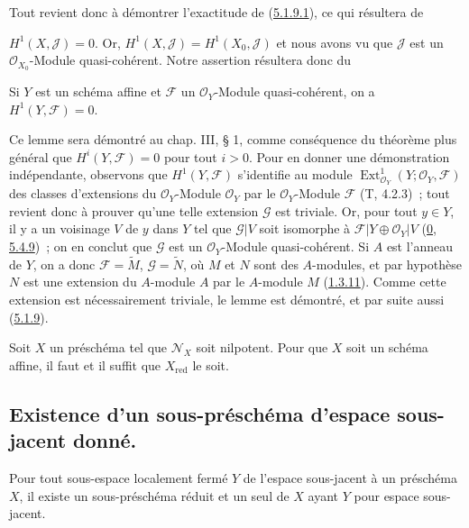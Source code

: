 Tout revient donc à démontrer l'exactitude de
(\hyperref[I.5.1.9.1-fr]{5.1.9.1}), ce qui résultera de

$H^1(X,\mathscr{J})=0$. Or,
$H^1(X,\mathscr{J})=H^1(X_0,\mathscr{J})$ et nous avons vu que
$\mathscr{J}$ est un $\mathscr{O}_{X_0}$-Module quasi-cohérent. Notre
assertion résultera donc du

\begin{lemma}[5.1.9.2]
\label{I.5.1.9.2-fr}
Si $Y$ est un schéma affine et $\mathscr{F}$ un $\mathscr{O}_Y$-Module
quasi-cohérent, on a $H^1(Y,\mathscr{F})=0$.
\end{lemma}

Ce lemme sera démontré au chap. III, § 1, comme conséquence du théorème plus
général que $H^i(Y,\mathscr{F})=0$ pour tout $i>0$. Pour en donner une
démonstration indépendante, observons que $H^1(Y,\mathscr{F})$ s'identifie au
module $\operatorname{Ext}^1_{\mathscr{O}_Y}
(Y;\mathscr{O}_Y,\mathscr{F})$ des classes d'extensions du
$\mathscr{O}_Y$-Module $\mathscr{O}_Y$ par le $\mathscr{O}_Y$-Module
$\mathscr{F}$ (T, 4.2.3)~; tout revient donc à prouver qu'une telle extension
$\mathscr{G}$ est triviale. Or, pour tout $y\in Y$, il y a un voisinage $V$
de $y$ dans $Y$ tel que $\mathscr{G}|V$ soit isomorphe à
$\mathscr{F}|Y\oplus\mathscr{O}_Y|V$
(\hyperref[0.5.4.9-fr]{0, 5.4.9})~; on en conclut que $\mathscr{G}$ est un
$\mathscr{O}_Y$-Module quasi-cohérent. Si $A$ est l'anneau de $Y$, on a donc
$\mathscr{F}=\widetilde{M}$, $\mathscr{G}=\widetilde{N}$, où $M$ et $N$ sont
des $A$-modules, et par hypothèse $N$ est une extension du $A$-module $A$ par
le $A$-module $M$ (\hyperref[I.1.3.11-fr]{1.3.11}). Comme cette extension est
nécessairement triviale, le lemme est démontré, et par suite aussi
(\hyperref[I.5.1.9-fr]{5.1.9}).

\begin{corollary}[5.1.10]
\label{I.5.1.10-fr}
Soit $X$ un préschéma tel que $\mathscr{N}_X$ soit nilpotent. Pour que $X$
soit un schéma affine, il faut et il suffit que $X_{\mathrm{red}}$ le soit.
\end{corollary}

\subsection{Existence d'un sous-préschéma d'espace sous-jacent donné.}
\label{subsection:I.5.2-fr}

\begin{proposition}[5.2.1]
\label{I.5.2.1-fr}
Pour tout sous-espace localement fermé $Y$ de l'espace sous-jacent à un
préschéma $X$, il existe un sous-préschéma réduit et un seul de $X$ ayant $Y$
pour espace sous-jacent.
\end{proposition}

